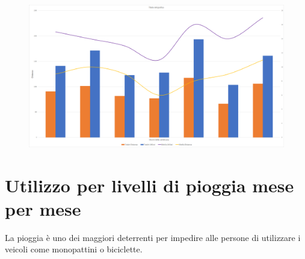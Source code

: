 \begin{figure}[H]                                                                                                                                                            
\centering                                                                                                                                                                   
\includegraphics[width=\textwidth]{images/result12}                                                                                                                                   
\label{fig:result12}                                                                                                                                                           
\end{figure}


\section{Utilizzo per livelli di pioggia mese per mese}
La pioggia è uno dei maggiori deterrenti per impedire alle persone di
utilizzare i veicoli come monopattini o biciclette.


